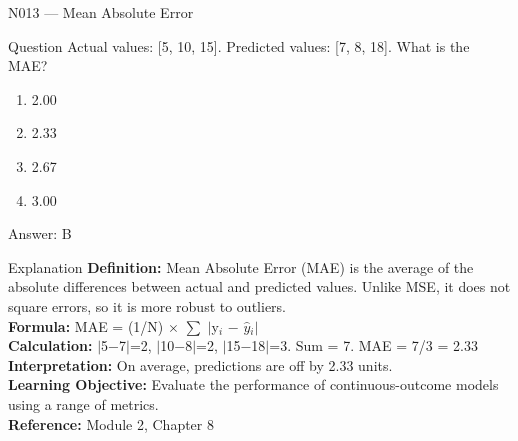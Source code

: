 \documentclass[aspectratio=169,8pt]{beamer}
\begin{document}
	\begin{frame}{N013 --- Mean Absolute Error}
		\begin{block}{Question}
			Actual values: [5, 10, 15]. Predicted values: [7, 8, 18]. What is the MAE?
			\begin{enumerate}
				\item 2.00
				\item 2.33
				\item 2.67
				\item 3.00
			\end{enumerate}
		\end{block}
		\begin{exampleblock}{Answer: B}\end{exampleblock}
		\begin{block}{Explanation}
			\textbf{Definition:} Mean Absolute Error (MAE) is the average of the absolute differences between actual and predicted values. Unlike MSE, it does not square errors, so it is more robust to outliers.\\
			\textbf{Formula:} MAE = (1/N) $\times$ $\sum$ $|$y$_{i}$ $-$ $\hat{y}$$_{i}$$|$\\
			\textbf{Calculation:} $|$5$-$7$|$=2, $|$10$-$8$|$=2, $|$15$-$18$|$=3. Sum = 7. MAE = 7/3 = 2.33\\
			\textbf{Interpretation:} On average, predictions are off by 2.33 units.\\
			\textbf{Learning Objective:} Evaluate the performance of continuous-outcome models using a range of metrics.\\
			\textbf{Reference:} Module 2, Chapter 8
		\end{block}
	\end{frame}
	
\end{document}
